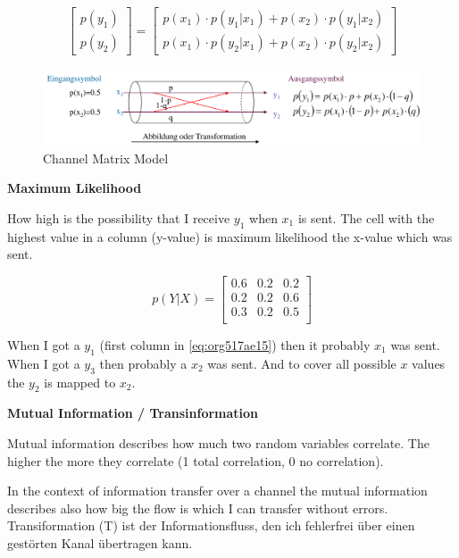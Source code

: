 \documentclass[11pt,twoside,twocolumn,landscape]{article}
\begin{document}
\begin{align}
  \begin{bmatrix}
    p(y_1) \\
    p(y_2)
  \end{bmatrix}
  = 
  \begin{bmatrix}
    p(x_1) \cdot p(y_1 | x_1) + p(x_2) \cdot p(y_1|x_2) \\
    p(x_1) \cdot p(y_2 | x_1) + p(x_2) \cdot p(y_2|x_2)
  \end{bmatrix}
\end{align}

\begin{figure}[htbp]
\centering
\includegraphics[width=.9\linewidth]{img/kanalmatrix_modell.png}
\caption{\label{fig:org105adcf}Channel Matrix Model}
\end{figure}

\textbf{Maximum Likelihood}

How high is the possibility that I receive \(y_1\) when \(x_1\) is sent.
The cell with the highest value in a column (y-value) is maximum likelihood the x-value which was sent.

\begin{equation}
\label{eq:org517ae15}
  p(Y|X) =
  \begin{bmatrix}
    0.6 & 0.2 & 0.2 \\
    0.2 & 0.2 & 0.6 \\
    0.3 & 0.2 & 0.5 \\
  \end{bmatrix}
\end{equation}

When I got a \(y_1\) (first column in \ref{eq:org517ae15}) then it probably \(x_1\) was sent.
When I got a \(y_3\) then probably a \(x_2\) was sent.
And to cover all possible \(x\) values the \(y_2\) is mapped to \(x_2\).

\textbf{Mutual Information / Transinformation}

Mutual information describes how much two random variables correlate.
The higher the more they correlate (1 total correlation, 0 no correlation).

In the context of information transfer over a channel the mutual information describes also how big the flow is which I can transfer without errors.
Transiformation (T) ist der Informationsfluss, den ich fehlerfrei über einen gestörten Kanal übertragen kann.
\end{document}
